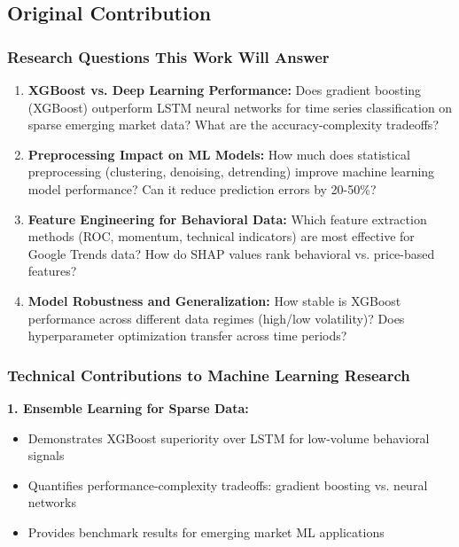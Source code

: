 \documentclass[12pt,a4paper]{article}
\begin{document}
\subsection{Original Contribution}

\subsubsection{Research Questions This Work Will Answer}

\begin{enumerate}
    \item \textbf{XGBoost vs. Deep Learning Performance:} Does gradient boosting (XGBoost) outperform LSTM neural networks for time series classification on sparse emerging market data? What are the accuracy-complexity tradeoffs?
    
    \item \textbf{Preprocessing Impact on ML Models:} How much does statistical preprocessing (clustering, denoising, detrending) improve machine learning model performance? Can it reduce prediction errors by 20-50\%?
    
    \item \textbf{Feature Engineering for Behavioral Data:} Which feature extraction methods (ROC, momentum, technical indicators) are most effective for Google Trends data? How do SHAP values rank behavioral vs. price-based features?
    
    \item \textbf{Model Robustness and Generalization:} How stable is XGBoost performance across different data regimes (high/low volatility)? Does hyperparameter optimization transfer across time periods?
\end{enumerate}

\subsubsection{Technical Contributions to Machine Learning Research}

\textbf{1. Ensemble Learning for Sparse Data:}
\begin{itemize}
    \item Demonstrates XGBoost superiority over LSTM for low-volume behavioral signals
    \item Quantifies performance-complexity tradeoffs: gradient boosting vs. neural networks
    \item Provides benchmark results for emerging market ML applications
\end{itemize}
\end{document}
